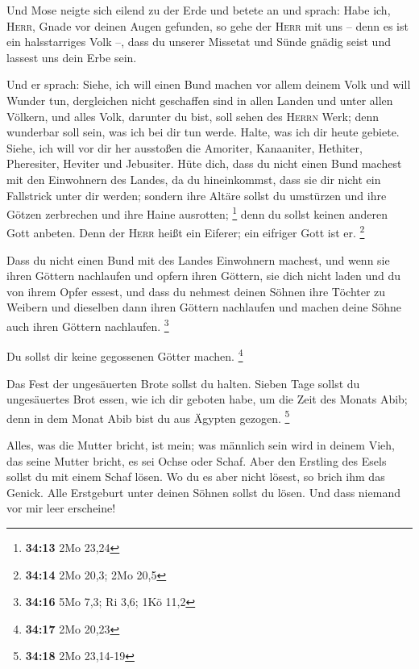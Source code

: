  Und Mose neigte sich eilend zu der Erde und betete an
 und sprach: Habe ich, \textsc{Herr}, Gnade vor deinen
Augen gefunden, so gehe der \textsc{Herr} mit uns -- denn es ist ein
halsstarriges Volk --, dass du unserer Missetat und Sünde gnädig seist
und lassest uns dein Erbe sein.

 Und er sprach: Siehe, ich will einen Bund machen vor
allem deinem Volk und will Wunder tun, dergleichen nicht geschaffen sind
in allen Landen und unter allen Völkern, und alles Volk, darunter du
bist, soll sehen des \textsc{Herrn} Werk; denn wunderbar soll sein, was
ich bei dir tun werde.  Halte, was ich dir heute gebiete.
Siehe, ich will vor dir her ausstoßen die Amoriter, Kanaaniter,
Hethiter, Pheresiter, Heviter und Jebusiter.  Hüte dich,
dass du nicht einen Bund machest mit den Einwohnern des Landes, da du
hineinkommst, dass sie dir nicht ein Fallstrick unter dir werden;
 sondern ihre Altäre sollst du umstürzen und ihre Götzen
zerbrechen und ihre Haine ausrotten; \footnote{\textbf{34:13} 2Mo 23,24}
 denn du sollst keinen anderen Gott anbeten. Denn der
\textsc{Herr} heißt ein Eiferer; ein eifriger Gott ist er. \footnote{\textbf{34:14}
  2Mo 20,3; 2Mo 20,5}

 Dass du nicht einen Bund mit des Landes Einwohnern
machest, und wenn sie ihren Göttern nachlaufen und opfern ihren Göttern,
sie dich nicht laden und du von ihrem Opfer essest,  und
dass du nehmest deinen Söhnen ihre Töchter zu Weibern und dieselben dann
ihren Göttern nachlaufen und machen deine Söhne auch ihren Göttern
nachlaufen. \footnote{\textbf{34:16} 5Mo 7,3; Ri 3,6; 1Kö 11,2}

 Du sollst dir keine gegossenen Götter machen.
\footnote{\textbf{34:17} 2Mo 20,23}

 Das Fest der ungesäuerten Brote sollst du halten. Sieben
Tage sollst du ungesäuertes Brot essen, wie ich dir geboten habe, um die
Zeit des Monats Abib; denn in dem Monat Abib bist du aus Ägypten
gezogen. \footnote{\textbf{34:18} 2Mo 23,14-19}

 Alles, was die Mutter bricht, ist mein; was männlich
sein wird in deinem Vieh, das seine Mutter bricht, es sei Ochse oder
Schaf.  Aber den Erstling des Esels sollst du mit einem
Schaf lösen. Wo du es aber nicht lösest, so brich ihm das Genick. Alle
Erstgeburt unter deinen Söhnen sollst du lösen. Und dass niemand vor mir
leer erscheine!

